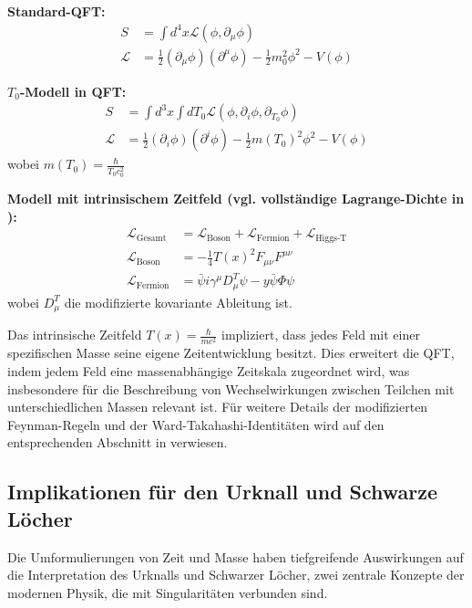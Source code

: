 \documentclass[a4paper,12pt]{article}
\newcommand{\Tfield}{T(x)}
\begin{document}
	\begin{tcolorbox}[colback=yellow!5!white,colframe=yellow!75!black,title=Umformulierung von QFT-Konzepten]
		\textbf{Standard-QFT:}
		\begin{align}
			S &= \int d^4x \mathcal{L}(\phi, \partial_\mu\phi) \\
			\mathcal{L} &= \frac{1}{2}(\partial_\mu\phi)(\partial^\mu\phi) - \frac{1}{2}m_0^2\phi^2 - V(\phi)
		\end{align}
		
		\textbf{\( T_0 \)-Modell in QFT:}
		\begin{align}
			S &= \int d^3x \int dT_0 \mathcal{L}(\phi, \partial_i\phi, \partial_{T_0}\phi) \\
			\mathcal{L} &= \frac{1}{2}(\partial_i\phi)(\partial^i\phi) - \frac{1}{2}m(T_0)^2\phi^2 - V(\phi)
		\end{align}
		wobei \( m(T_0) = \frac{\hbar}{T_0 c_0^2} \)
		
		\textbf{Modell mit intrinsischem Zeitfeld (vgl. vollständige Lagrange-Dichte in \cite{wesentlicheFormalismen}\relax):}
		\begin{align}
			\mathcal{L}_{\text{Gesamt}} &= \mathcal{L}_{\text{Boson}} + \mathcal{L}_{\text{Fermion}} + \mathcal{L}_{\text{Higgs-T}} \\
			\mathcal{L}_{\text{Boson}} &= -\frac{1}{4} \Tfield^2 F_{\mu\nu}F^{\mu\nu} \\
			\mathcal{L}_{\text{Fermion}} &= \bar{\psi}i\gamma^\mu D_\mu^T\psi - y\bar{\psi}\Phi\psi
		\end{align}
		wobei \( D_\mu^T \) die modifizierte kovariante Ableitung ist.
	\end{tcolorbox}
	
	Das intrinsische Zeitfeld \(\Tfield = \frac{\hbar}{m c^2}\) impliziert, dass jedes Feld mit einer spezifischen Masse seine eigene Zeitentwicklung besitzt. Dies erweitert die QFT, indem jedem Feld eine massenabhängige Zeitskala zugeordnet wird, was insbesondere für die Beschreibung von Wechselwirkungen zwischen Teilchen mit unterschiedlichen Massen relevant ist. Für weitere Details der modifizierten Feynman-Regeln und der Ward-Takahashi-Identitäten wird auf den entsprechenden Abschnitt in \cite{wesentlicheFormalismen}\relax verwiesen.
	
	\subsection{Implikationen für den Urknall und Schwarze Löcher}
	Die Umformulierungen von Zeit und Masse haben tiefgreifende Auswirkungen auf die Interpretation des Urknalls und Schwarzer Löcher, zwei zentrale Konzepte der modernen Physik, die mit Singularitäten verbunden sind.
	
\end{document}
